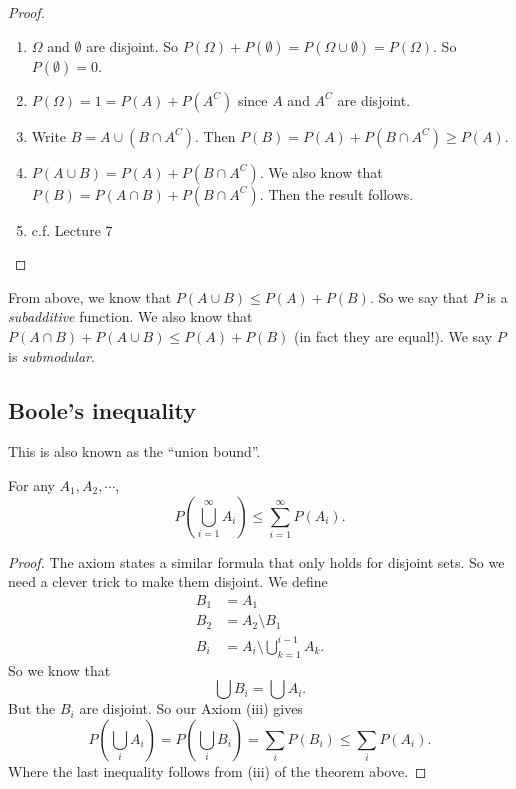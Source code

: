 \documentclass[a4paper]{article}
\begin{document}
\begin{proof}\leavevmode
  \begin{enumerate}
    \item $\Omega$ and $\emptyset$ are disjoint. So $P(\Omega) + P(\emptyset) = P(\Omega \cup \emptyset) = P(\Omega)$. So $P(\emptyset) = 0$.
    \item $P(\Omega) = 1 = P(A) + P(A^C)$ since $A$ and $A^C$ are disjoint.
    \item Write $B = A\cup (B\cap A^C)$. Then $P(B) = P(A) + P(B\cap A^C) \geq P(A)$.
    \item $P(A\cup B) = P(A) + P(B\cap A^C)$. We also know that $P(B) = P(A\cap B) + P(B\cap A^C)$. Then the result follows.
    \item c.f. Lecture 7
  \end{enumerate}
\end{proof}

From above, we know that $P(A\cup B) \leq P(A) + P(B)$. So we say that $P$ is a \emph{subadditive} function.  We also know that $P(A\cap B) + P(A \cup B) \leq P(A) + P(B)$ (in fact they are equal!). We say $P$ is \emph{submodular}.

\subsection{Boole's inequality}
This is also known as the ``union bound''.
\begin{thm}
  For any $A_1, A_2, \cdots$,
  \[
    P\left(\bigcup_{i = 1}^\infty A_i\right) \leq \sum_{i =1}^\infty P(A_i).
  \]
\end{thm}

\begin{proof}
  The axiom states a similar formula that only holds for disjoint sets. So we need a clever trick to make them disjoint. We define
  \begin{align*}
    B_1 &= A_1\\
    B_2 &= A_2\setminus B_1\\
    B_i &= A_i\setminus \bigcup_{k = 1}^{i -1 }A_k.
  \end{align*}
  So we know that
  \[
    \bigcup B_i = \bigcup A_i.
  \]
  But the $B_i$ are disjoint. So our Axiom (iii) gives
  \[
    P(\bigcup_i A_i) = P(\bigcup _i B_i) = \sum_i P(B_i) \leq \sum_i P(A_i).
  \]
  Where the last inequality follows from (iii) of the theorem above.
\end{proof}
\end{document}
